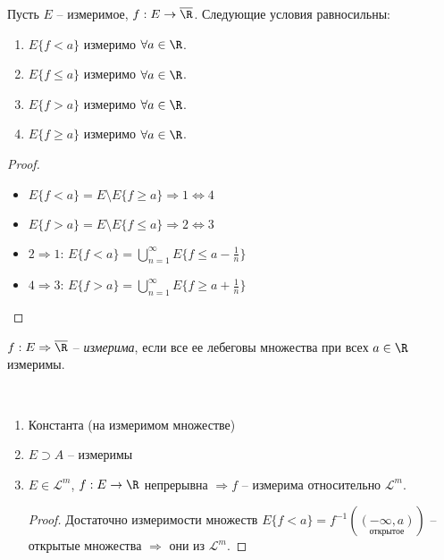 \begin{theorem}
    Пусть $E$ – измеримое, $f:E\rightarrow \overline{\R}$. Следующие условия 
    равносильны:

    \begin{enumerate}
        \item $E\{f<a\}$ измеримо $\forall a\in \R$.
        
        \item $E\{f\leq a\}$ измеримо $\forall a\in \R$.
        
        \item $E\{f>a\}$ измеримо $\forall a\in \R$.
        
        \item $E\{f\geq a\}$ измеримо $\forall a\in \R$.
    \end{enumerate}
\end{theorem}

\begin{proof}~

    \begin{itemize}
        \item $E\{f<a\} = E\setminus E\{f\geq a\}\Rightarrow 1\Leftrightarrow 4$
        
        \item $E\{f>a\} = E\setminus E\{f\leq a\}\Rightarrow 2\Leftrightarrow 3$
        
        \item $2\Rightarrow 1$: $E\{f<a\} =\bigcup\limits_{n=1}^\infty E\{f\leq a-\frac{1}{n}\}$
        
        \item $4\Rightarrow 3$: $E\{f>a\} =\bigcup\limits_{n=1}^\infty E\{f\geq a+\frac{1}{n}\}$
    \end{itemize}
\end{proof}

\begin{definition}
    $f:E\Rightarrow \overline{\R}$ – \textit{измерима}, если все ее лебеговы множества 
    при всех $a\in \R$ измеримы.
\end{definition}

\begin{example}~
    \begin{enumerate}
        \item Константа (на измеримом множестве)
        
        \item $E\supset A$ – измеримы
        

        \item $E\in \mathcal{L}^m$, $f:E\rightarrow \R$ непрерывна $\Rightarrow f$ – 
        измерима относительно $\mathcal{L}^m$.

        \begin{proof}
            Достаточно измеримости множеств $E\{f<a\}=f^{-1}(\underset{\text{открытое}}{(-\infty, a)})$ – открытые 
            множества $\Rightarrow$ они из  $\mathcal{L}^m$.
        \end{proof}
    \end{enumerate}
\end{example}

